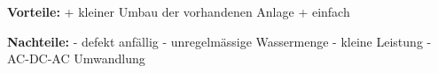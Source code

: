 \bigskip

\textbf{Vorteile:}								\newline
+	kleiner Umbau der vorhandenen Anlage		\newline
+	einfach										\newline
	
\textbf{Nachteile:}								\newline
- 	defekt anfällig								\newline
-	unregelmässige Wassermenge					\newline
-	kleine Leistung								\newline
-	AC-DC-AC Umwandlung							\newline


